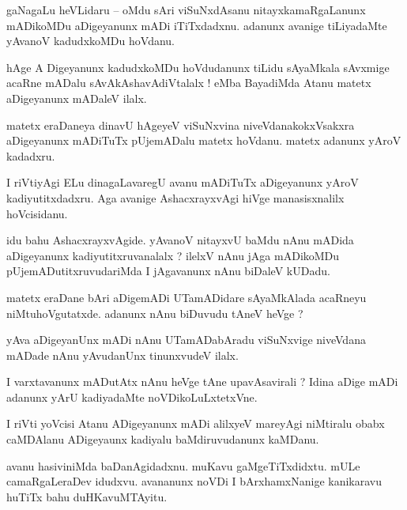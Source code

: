 \documentclass{article}
\begin{document}
\begin{mn}%
gaNagaLu heVLidaru -- oMdu sAri viSuNxdAsanu nitayxkamaRgaLanunx mADikoMDu aDigeyanunx mADi 
iTiTxdadxnu. adanunx avanige tiLiyadaMte yAvanoV kadudxkoMDu hoVdanu.
\end{mn}

\begin{mn}%
hAge A Digeyanunx kadudxkoMDu hoVdudanunx tiLidu sAyaMkala sAvxmige acaRne mADalu 
sAvAkAshavAdiVtalalx ! eMba BayadiMda Atanu matetx aDigeyanunx mADaleV ilalx. 
\end{mn}

\begin{mn}%
matetx eraDaneya dinavU hAgeyeV viSuNxvina niveVdanakokxVsakxra aDigeyanunx mADiTuTx pUjemADalu 
matetx hoVdanu. matetx adanunx yAroV kadadxru.
\end{mn}

\begin{mn}%
I riVtiyAgi ELu dinagaLavaregU avanu mADiTuTx aDigeyanunx yAroV kadiyutitxdadxru. Aga avanige 
AshacxrayxvAgi hiVge manasisxnalilx hoVcisidanu.
\end{mn}

\begin{mn}%
idu bahu AshacxrayxvAgide. yAvanoV nitayxvU baMdu nAnu mADida aDigeyanunx kadiyutitxruvanalalx ? 
ilelxV nAnu jAga mADikoMDu pUjemADutitxruvudariMda I jAgavanunx nAnu biDaleV kUDadu.
\end{mn}

\begin{mn}%
matetx eraDane bAri aDigemADi UTamADidare sAyaMkAlada acaRneyu niMtuhoVgutatxde. adanunx nAnu 
biDuvudu tAneV heVge ?
\end{mn}

\begin{mn}%
yAva aDigeyanUnx mADi nAnu UTamADabAradu viSuNxvige niveVdana mADade nAnu yAvudanUnx tinunxvudeV 
ilalx.
\end{mn}

\begin{mn}%
I varxtavanunx mADutAtx nAnu heVge tAne upavAsavirali ? Idina aDige mADi adanunx yArU kadiyadaMte 
noVDikoLuLxtetxVne.
\end{mn}

\begin{mn}%
I riVti yoVcisi Atanu ADigeyanunx mADi alilxyeV mareyAgi niMtiralu obabx caMDAlanu ADigeyaunx 
kadiyalu baMdiruvudanunx kaMDanu.
\end{mn}

\begin{mn}%
avanu hasiviniMda baDanAgidadxnu. muKavu gaMgeTiTxdidxtu. mULe camaRgaLeraDev idudxvu. avananunx 
noVDi I bArxhamxNanige kanikaravu huTiTx bahu duHKavuMTAyitu.
\end{mn}
\end{document}
